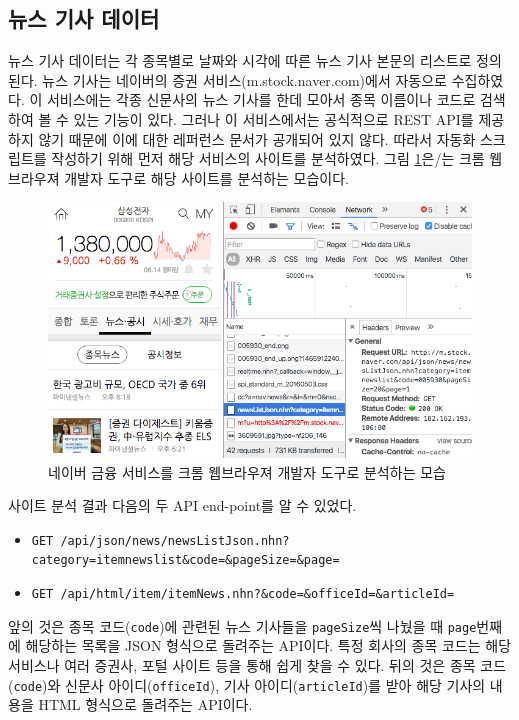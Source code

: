 \documentclass[a4paper,10pt]{article}
\begin{document}
\subsection{뉴스 기사 데이터}

뉴스 기사 데이터는 각 종목별로 날짜와 시각에 따른 뉴스 기사 본문의 리스트로 정의된다.
뉴스 기사는 네이버의 증권 서비스(m.stock.naver.com)에서 자동으로 수집하였다.
이 서비스에는 각종 신문사의 뉴스 기사를 한데 모아서 종목 이름이나 코드로 검색하여 볼 수 있는 기능이 있다.
그러나 이 서비스에서는 공식적으로 REST API를 제공하지 않기 때문에 이에 대한 레퍼런스 문서가 공개되어 있지 않다.
따라서 자동화 스크립트를 작성하기 위해 먼저 해당 서비스의 사이트를 분석하였다.
그림 \ref{fig:naver_stock}은/는 크롬 웹브라우져 개발자 도구로 해당 사이트를 분석하는 모습이다.
\begin{figure}[h]
\includegraphics[width=\textwidth]{naver_stock}
\centering
\caption{네이버 금융 서비스를 크롬 웹브라우져 개발자 도구로 분석하는 모습}
\label{fig:naver_stock}
\end{figure}
사이트 분석 결과 다음의 두 API end-point를 알 수 있었다.
\begin{itemize}
\item \texttt{GET /api/json/news/newsListJson.nhn?category=itemnewslist\&code=\&pageSize=\&page=}
\item \texttt{GET /api/html/item/itemNews.nhn?\&code=\&officeId=\&articleId=}
\end{itemize}
앞의 것은 종목 코드(\texttt{code})에 관련된 뉴스 기사들을 \texttt{pageSize}씩 나눴을 때 \texttt{page}번째에 해당하는 목록을 JSON 형식으로 돌려주는 API이다.
특정 회사의 종목 코드는 해당 서비스나 여러 증권사, 포털 사이트 등을 통해 쉽게 찾을 수 있다.
뒤의 것은 종목 코드(\texttt{code})와 신문사 아이디(\texttt{officeId}), 기사 아이디(\texttt{articleId})를 받아 해당 기사의 내용을 HTML 형식으로 돌려주는 API이다.
\end{document}
